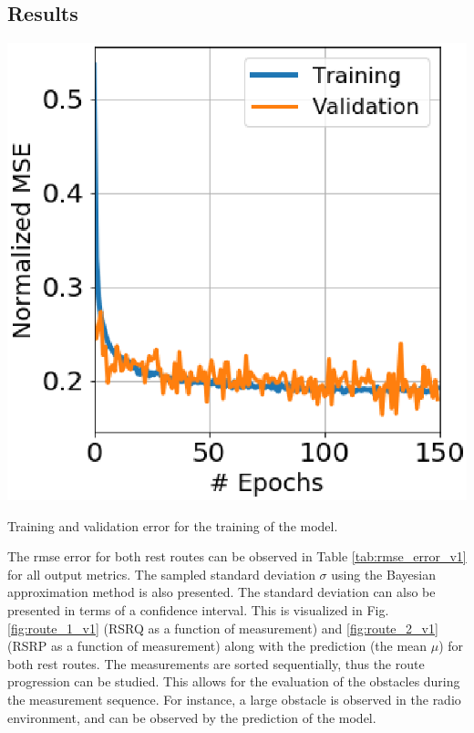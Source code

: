 \subsection{Results}
\begin{marginfigure}
    \centering
    \includegraphics{chapters/part_pathloss/drive_test_minimzation_paper/training_val_test_5ab7fb562d60543b24f857af.eps}
    \caption{Training and validation error for the training of the model.}
    \label{fig:training_val_error}
\end{marginfigure}

The \gls{rmse} error for both rest routes can be observed in Table \ref{tab:rmse_error_v1} for all output metrics. The sampled standard deviation $\sigma$ using the Bayesian approximation method is also presented. The standard deviation can also be presented in terms of a confidence interval. This is visualized in Fig. \ref{fig:route_1_v1} (RSRQ as a function of measurement) and \ref{fig:route_2_v1} (RSRP as a function of measurement) along with the prediction (the mean $\mu$) for both rest routes. The measurements are sorted sequentially, thus the route progression can be studied. This allows for the evaluation of the obstacles during the measurement sequence. For instance, a large obstacle is observed in the radio environment, and can be observed by the prediction of the model. 

